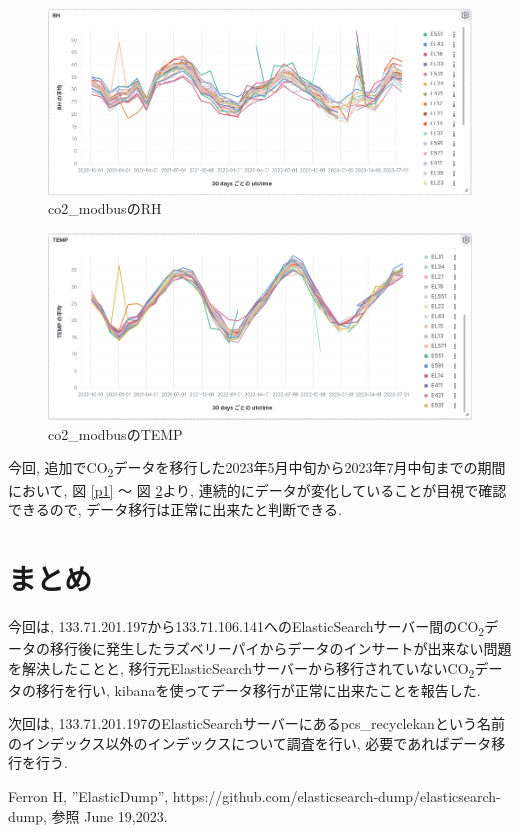 \documentclass[a4j,12pt,]{jarticle}
\begin{document}
\begin{figure}[H]
  \begin{center}
    \includegraphics[width=160mm]{rh.png}
    \caption{co2\_modbusのRH}
    \label{p2}
  \end{center}
\end{figure}

\begin{figure}[H]
  \begin{center}
    \includegraphics[width=160mm]{temp.png}
    \caption{co2\_modbusのTEMP}
    \label{p3}
  \end{center}
\end{figure}

今回, 追加でCO\textsubscript{2}データを移行した2023年5月中旬から2023年7月中旬までの期間において, 図 \ref{p1} 〜 図 \ref{p3}より, 連続的にデータが変化していることが目視で確認できるので, データ移行は正常に出来たと判断できる.

\section{まとめ}
今回は, 133.71.201.197から133.71.106.141へのElasticSearchサーバー間のCO\textsubscript{2}データの移行後に発生したラズベリーパイからデータのインサートが出来ない問題を解決したことと, 移行元ElasticSearchサーバーから移行されていないCO\textsubscript{2}データの移行を行い, kibanaを使ってデータ移行が正常に出来たことを報告した.

次回は, 133.71.201.197のElasticSearchサーバーにあるpcs\_recyclekanという名前のインデックス以外のインデックスについて調査を行い, 必要であればデータ移行を行う.

\begin{thebibliography}{5}
  Ferron H, ”ElasticDump”, https://github.com/elasticsearch-dump/elasticsearch-dump, 参照 June 19,2023.
\end{thebibliography}
\end{document}
